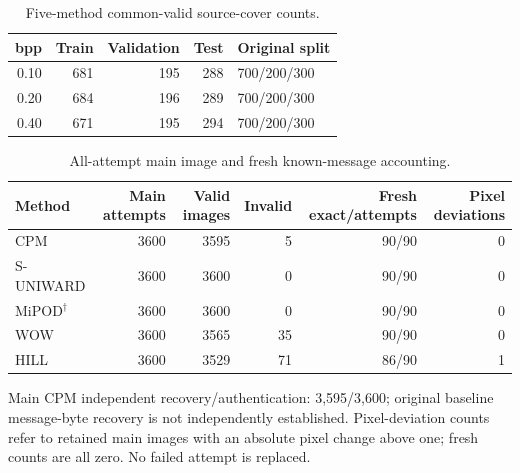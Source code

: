 \documentclass[journal]{IEEEtran}
\renewcommand{\arraystretch}{1.2}
\renewcommand{\arraystretch}{1.0}
\theoremstyle{definition}
\theoremstyle{game}
\renewcommand{\arraystretch}{1.5}
\begin{document}
\begin{table}[!t]
\centering\footnotesize
\caption{Five-method common-valid source-cover counts.}
\label{tab:hsm-cohorts}
\setlength{\tabcolsep}{4pt}\renewcommand{\arraystretch}{1.15}
\begin{tabular}{rrrrl}
\toprule
bpp & Train & Validation & Test & Original split\\
\midrule
0.10 & 681 & 195 & 288 & 700/200/300\\
0.20 & 684 & 196 & 289 & 700/200/300\\
0.40 & 671 & 195 & 294 & 700/200/300\\
\bottomrule
\end{tabular}

\end{table}

\begin{table}[!t]
\centering\footnotesize
\caption{All-attempt main image and fresh known-message accounting.}
\label{tab:hsm-accounting}
\setlength{\tabcolsep}{4pt}\renewcommand{\arraystretch}{1.15}
\begin{tabular}{lrrrrr}
\toprule
Method & Main attempts & Valid images & Invalid & Fresh exact/attempts & Pixel deviations\\
\midrule
CPM & 3600 & 3595 & 5 & 90/90 & 0\\
S-UNIWARD & 3600 & 3600 & 0 & 90/90 & 0\\
MiPOD$^\dagger$ & 3600 & 3600 & 0 & 90/90 & 0\\
WOW & 3600 & 3565 & 35 & 90/90 & 0\\
HILL & 3600 & 3529 & 71 & 86/90 & 1\\
\bottomrule
\end{tabular}
\par\smallskip\parbox{.97\textwidth}{\footnotesize Main CPM independent recovery/authentication: 3,595/3,600; original baseline message-byte recovery is not independently established. Pixel-deviation counts refer to retained main images with an absolute pixel change above one; fresh counts are all zero. No failed attempt is replaced.}
\end{table}
\end{document}
